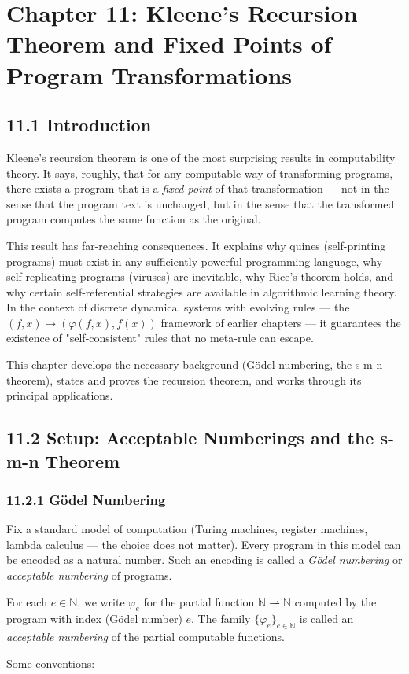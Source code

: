 \chapter{Chapter 11: Kleene's Recursion Theorem and Fixed Points of Program Transformations}

\section{11.1 Introduction}

Kleene's recursion theorem is one of the most surprising results in computability theory. It says, roughly, that for any computable way of transforming programs, there exists a program that is a \textit{fixed point} of that transformation --- not in the sense that the program text is unchanged, but in the sense that the transformed program computes the same function as the original.

This result has far-reaching consequences. It explains why quines (self-printing programs) must exist in any sufficiently powerful programming language, why self-replicating programs (viruses) are inevitable, why Rice's theorem holds, and why certain self-referential strategies are available in algorithmic learning theory. In the context of discrete dynamical systems with evolving rules --- the $(f, x) \mapsto (\varphi(f, x), f(x))$ framework of earlier chapters --- it guarantees the existence of "self-consistent" rules that no meta-rule can escape.

This chapter develops the necessary background (Gödel numbering, the s-m-n theorem), states and proves the recursion theorem, and works through its principal applications.

\section{11.2 Setup: Acceptable Numberings and the s-m-n Theorem}

\subsection{11.2.1 Gödel Numbering}

Fix a standard model of computation (Turing machines, register machines, lambda calculus --- the choice does not matter). Every program in this model can be encoded as a natural number. Such an encoding is called a \textit{Gödel numbering} or \textit{acceptable numbering} of programs.

\begin{definition}
For each $e \in \mathbb{N}$, we write $\varphi_e$ for the partial function $\mathbb{N} \rightharpoonup \mathbb{N}$ computed by the program with index (Gödel number) $e$. The family $\{ \varphi_e\} _{e \in \mathbb{N}}$ is called an \textit{acceptable numbering} of the partial computable functions.

Some conventions:
\end{definition}

